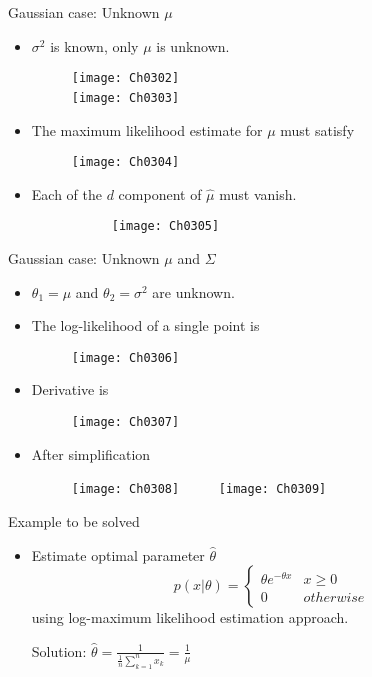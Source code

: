 \begin{frame}{Gaussian case: Unknown $\mu$}
\begin{itemize}
\item $\sigma^2$ is known, only $\mu$ is unknown.
\begin{figure}
\texttt{[image: Ch0302]}\\
\texttt{[image: Ch0303]}~~~~~~~~~
\end{figure}
\item The maximum likelihood estimate for $\mu$ must satisfy
\begin{figure}
\texttt{[image: Ch0304]}
\end{figure}
\item Each of the $d$ component of $\hat{\mu}$ must vanish.
\begin{figure}
\begin{figure}
\texttt{[image: Ch0305]}
\end{figure}
\end{figure}
\end{itemize}
\end{frame}

\begin{frame}{Gaussian case: Unknown $\mu$ and $\Sigma$}
\begin{itemize}
\item $\theta_1 = \mu$ and $\theta_2=\sigma^2$ are unknown.
\item The log-likelihood of a single point is
\begin{figure}
\texttt{[image: Ch0306]}
\end{figure}
\item Derivative is
\begin{figure}
\texttt{[image: Ch0307]}
\end{figure}
\item After simplification
\begin{figure}
\texttt{[image: Ch0308]}~~~~~
\texttt{[image: Ch0309]}
\end{figure}
\end{itemize}
\end{frame}

\begin{frame}{Example to be solved}
\begin{itemize}
\item Estimate optimal parameter $\hat{\theta}$
\begin{equation}
p(x|\theta ) = \left\{ {\begin{array}{*{20}{c}}
{\theta {e^{ - \theta x}}}&{x \ge 0}\\
0&{otherwise}
\end{array}} \right.\nonumber
\end{equation}
using log-maximum likelihood estimation approach.

\vspace{0.5cm}
Solution: $\hat{\theta}=\frac{1}{\frac{1}{n}\sum_{k=1}^{n}x_k}=\frac{1}{\mu}$
\end{itemize}
\end{frame}

